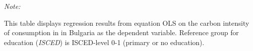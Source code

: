 \begin{table}[htbp!]
\begin{adjustbox}{width = 1\textwidth, max height = 0.95\textheight, center}
\begin{threeparttable}[b]
         \begin{tablenotes}\item \medskip \textit{Note:}
            \item This table displays regression results from equation OLS on the carbon intensity of consumption in  in Bulgaria as the dependent variable. Reference group for education (\textit{ISCED}) is ISCED-level 0-1 (primary or no education).
         \end{tablenotes}
      \end{threeparttable}
   \end{adjustbox}
\end{table}



